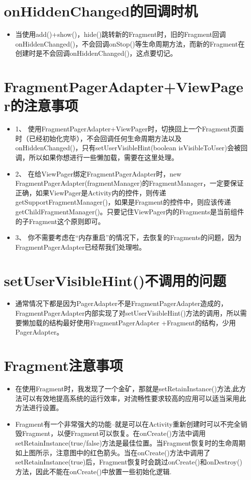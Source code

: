 \documentclass[9pt, b5paaper]{book}
\begin{document}
\section{onHiddenChanged的回调时机}
\label{sec-2-5}
\begin{itemize}
\item 当使用add()+show()，hide()跳转新的Fragment时，旧的Fragment回调onHiddenChanged()，不会回调onStop()等生命周期方法，而新的Fragment在创建时是不会回调onHiddenChanged()，这点要切记。
\end{itemize}
\section{FragmentPagerAdapter+ViewPager的注意事项}
\label{sec-2-6}
\begin{itemize}
\item 1、 使用FragmentPagerAdapter+ViewPager时，切换回上一个Fragment页面时（已经初始化完毕），不会回调任何生命周期方法以及onHiddenChanged()，只有setUserVisibleHint(boolean isVisibleToUser)会被回调，所以如果你想进行一些懒加载，需要在这里处理。
\item 2、 在给ViewPager绑定FragmentPagerAdapter时，new FragmentPagerAdapter(fragmentManager)的FragmentManager，一定要保证正确，如果ViewPager是Activity内的控件，则传递getSupportFragmentManager()，如果是Fragment的控件中，则应该传递getChildFragmentManager()。只要记住ViewPager内的Fragments是当前组件的子Fragment这个原则即可。
\item 3、 你不需要考虑在“内存重启”的情况下，去恢复的Fragments的问题，因为FragmentPagerAdapter已经帮我们处理啦。
\end{itemize}
\section{setUserVisibleHint()不调用的问题}
\label{sec-2-7}
\begin{itemize}
\item 通常情况下都是因为PagerAdapter不是FragmentPagerAdapter造成的，FragmentPagerAdapter内部实现了对setUserVisibleHint()方法的调用，所以需要懒加载的结构最好使用FragmentPagerAdapter +Fragment的结构，少用PagerAdapter。
\end{itemize}

\section{Fragment注意事项}
\label{sec-2-8}
\begin{itemize}
\item 在使用Fragment时，我发现了一个金矿，那就是setRetainInstance()方法,此方法可以有效地提高系统的运行效率，对流畅性要求较高的应用可以适当采用此方法进行设置。
\item Fragment有一个非常强大的功能--就是可以在Activity重新创建时可以不完全销毁Fragment，以便Fragment可以恢复。在onCreate()方法中调用setRetainInstance(true/false)方法是最佳位置。当Fragment恢复时的生命周期如上图所示，注意图中的红色箭头。当在onCreate()方法中调用了setRetainInstance(true)后，Fragment恢复时会跳过onCreate()和onDestroy()方法，因此不能在onCreate()中放置一些初始化逻辑.
\end{itemize}
\end{document}
